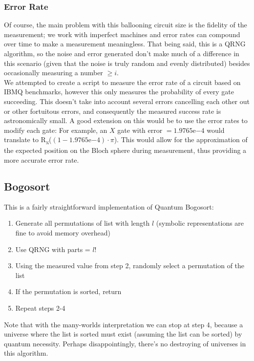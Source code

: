 \documentclass[12pt]{article}
\begin{document}
\subsubsection{Error Rate}
Of course, the main problem with this ballooning circuit size is the fidelity of the measurement; we work with imperfect machines and error rates can compound over time to make a measurement meaningless. 
That being said, this is a QRNG algorithm, so the noise and error generated don't make much of a difference in this scenario (given that the noise is truly random and evenly distributed) besides occasionally measuring a number $ \geq i$. \\
We attempted to create a script to measure the error rate of a circuit based on IBMQ benchmarks, however this only measures the probability of every gate succeeding. This doesn't take into account several errors cancelling each other out or other fortuitous errors, and consequently the measured success rate is astronomically small. A good extension on this would be to use the error rates to modify each gate: For example, an $X$ gate with error $= 1.9765\mathrm{e}{-4}$ would translate to R\textsubscript{x}($(1-1.9765\mathrm{e}{-4}) \cdot \pi$). This would allow for the approximation of the expected position on the Bloch sphere during measurement, thus providing a more accurate error rate.

\subsection{Bogosort}
This is a fairly straightforward implementation of Quantum Bogosort:
\begin{enumerate}
    \item Generate all permutations of list with length $l$ (symbolic representations are fine to avoid memory overhead)
    \item Use QRNG with parts = $l!$
    \item Using the measured value from step 2, randomly select a permutation of the list
    \item If the permutation is sorted, return
    \item Repeat steps 2-4
\end{enumerate}
\vspace{15mm}
Note that with the many-worlds interpretation we can stop at step 4, because a universe where the list is sorted must exist (assuming the list can be sorted) by quantum necessity. Perhaps disappointingly, there's no destroying of universes in this algorithm.
\end{document}
